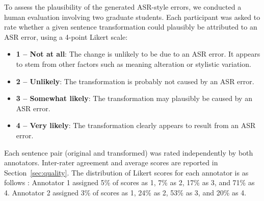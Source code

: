 To assess the plausibility of the generated ASR-style errors, we conducted a human evaluation involving two graduate students. Each participant was asked to rate whether a given sentence transformation could plausibly be attributed to an ASR error, using a 4-point Likert scale:

\begin{itemize}
    \item \textbf{1 – Not at all}: The change is unlikely to be due to an ASR error. It appears to stem from other factors such as meaning alteration or stylistic variation.
    \item \textbf{2 – Unlikely}: The transformation is probably not caused by an ASR error.
    \item \textbf{3 – Somewhat likely}: The transformation may plausibly be caused by an ASR error.
    \item \textbf{4 – Very likely}: The transformation clearly appears to result from an ASR error.
\end{itemize}

Each sentence pair (original and transformed) was rated independently by both annotators. Inter-rater agreement and average scores are reported in Section~\ref{sec:quality}. The distribution of Likert scores for each annotator is as follows : Annotator 1 assigned 5\% of scores as 1, 7\% as 2, 17\% as 3, and 71\% as 4. Annotator 2 assigned 3\% of scores as 1, 24\% as 2, 53\% as 3, and 20\% as 4.








